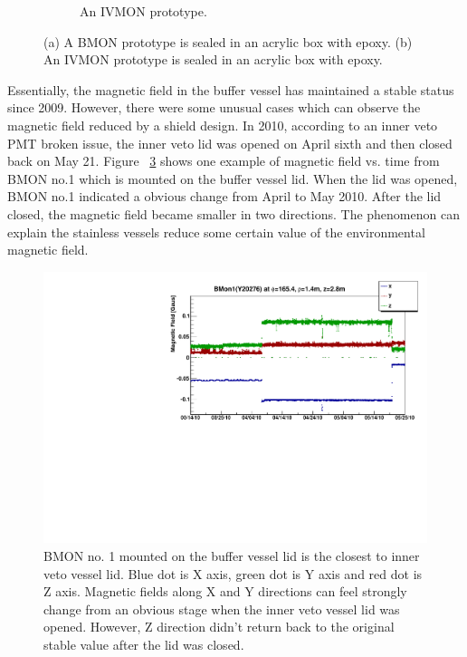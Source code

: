 \documentclass{JINST}
\begin{document}
\begin{figure}
\begin{subfigure}[b]{0.5\textwidth}
                \caption{An IVMON prototype.}
                \label{fig4b}
        \end{subfigure}

        \caption{(a) A BMON prototype is sealed in an acrylic box with epoxy. (b) An IVMON prototype is sealed in an acrylic box with epoxy.  }\label{figure4}
\end{figure}

Essentially, the magnetic field in the buffer vessel has maintained a stable status since 2009. However, there were some unusual cases which can observe the magnetic field reduced by a shield design. In 2010, according to an inner veto PMT broken issue, the inner veto lid was opened on April sixth and then closed back on May 21. Figure ~\ref{fig6} shows one example of magnetic field vs. time from BMON no.1 which is mounted on the buffer vessel lid. When the lid was opened, BMON no.1 indicated a obvious change from April to May 2010. After the lid closed, the magnetic field became smaller in two directions. The phenomenon can explain the stainless vessels reduce some certain value of the environmental magnetic field.
\begin{figure}
\centering
\includegraphics[width=.6\textwidth]{BMon01_MagField_2010-3-15to2010-5-25.pdf}
\caption{BMON no. 1 mounted on the buffer vessel lid is the closest to inner veto vessel lid. Blue dot is X axis, green dot is Y axis and red dot is Z axis. Magnetic fields along X and Y directions can feel strongly change from an obvious stage  when the inner veto vessel lid was opened. However, Z direction didn\textquoteright t return back to the original stable value after the lid was closed.}
\label{fig6}
\end{figure}
\end{document}
